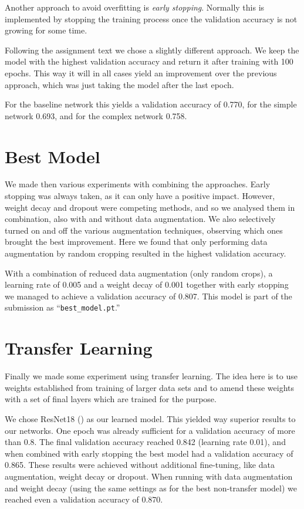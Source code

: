 \documentclass[sigconf,nonacm]{acmart}
\begin{document}
Another approach to avoid overfitting is \emph{early stopping}.
Normally this is implemented by stopping the training process
once the validation accuracy is not growing for some time.

Following the assignment text we chose a slightly different
approach.
We keep the model with the highest validation accuracy 
and return it after training with 100 epochs.
This way it will in all cases yield an improvement over
the previous approach, which was just taking the model
after the last epoch.

For the baseline network this yields a validation accuracy
of 0.770, for the simple network 0.693, and for the
complex network 0.758.

\section{Best Model}

We made then various experiments with combining the
approaches.
Early stopping was always taken, as it can only have
a positive impact.
However, weight decay and dropout were competing
methods, and so we analysed them in combination,
also with and without data augmentation.
We also selectively turned on
and off the various augmentation techniques,
observing which ones brought the best improvement.
Here we found that only performing data augmentation
by random cropping resulted in the highest validation
accuracy.

With a combination of reduced data augmentation (only random
crops), a learning rate of 0.005 and a weight decay of 0.001
together with early stopping
we managed to achieve a validation accuracy of 0.807.
This model is part of the submission as ``\texttt{best\_model.pt}.''

\section{Transfer Learning}

Finally we made some experiment using transfer
learning.
The idea here is to use weights established from training
of larger data sets and to amend these weights with
a set of final layers which are trained for the purpose.

We chose ResNet18 (\cite{resnet2015}) as our learned
model.
This yielded way superior results to our networks.
One epoch was already sufficient for a validation accuracy
of more than 0.8.
The final validation accuracy reached 0.842 (learning
rate 0.01), and when combined with early stopping the best
model had a validation accuracy of 0.865.
These results were achieved without additional fine-tuning, like
data augmentation, weight decay or dropout.
When running with data augmentation and weight decay (using the
same settings as for the best non-transfer model) we reached even
a validation accuracy of 0.870.
\end{document}
